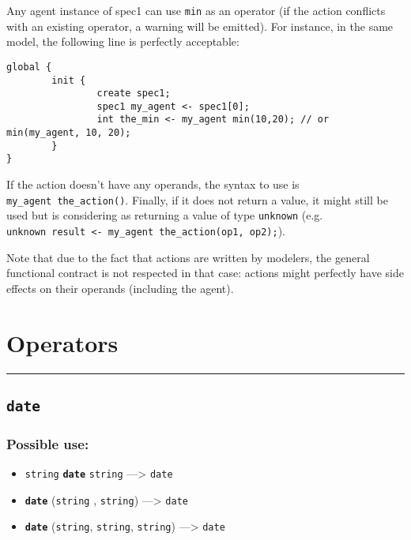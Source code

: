\documentclass[]{book}
\providecommand{\tightlist}{%
  \setlength{\itemsep}{0pt}\setlength{\parskip}{0pt}}
\theoremstyle{definition}
\theoremstyle{definition}
\theoremstyle{definition}
\theoremstyle{remark}
\begin{document}
Any agent instance of spec1 can use \texttt{min} as an operator (if the
action conflicts with an existing operator, a warning will be emitted).
For instance, in the same model, the following line is perfectly
acceptable:

\begin{verbatim}
global {
        init {
                create spec1;
                spec1 my_agent <- spec1[0];
                int the_min <- my_agent min(10,20); // or min(my_agent, 10, 20);
        }
}
\end{verbatim}

If the action doesn't have any operands, the syntax to use is
\texttt{my\_agent\ the\_action()}. Finally, if it does not return a
value, it might still be used but is considering as returning a value of
type \texttt{unknown} (e.g.
\texttt{unknown\ result\ \textless{}-\ my\_agent\ the\_action(op1,\ op2);}).

Note that due to the fact that actions are written by modelers, the
general functional contract is not respected in that case: actions might
perfectly have side effects on their operands (including the agent).

\section{Operators}\label{operators-2}

\begin{center}\rule{0.5\linewidth}{\linethickness}\end{center}

\subsection{\texorpdfstring{\texttt{date}}{date}}\label{date}

\subsubsection{Possible use:}\label{possible-use-124}

\begin{itemize}
\tightlist
\item
  \texttt{string} \textbf{\texttt{date}} \texttt{string}
  ---\textgreater{} \texttt{date}
\item
  \textbf{\texttt{date}} (\texttt{string} , \texttt{string})
  ---\textgreater{} \texttt{date}
\item
  \textbf{\texttt{date}} (\texttt{string}, \texttt{string},
  \texttt{string}) ---\textgreater{} \texttt{date}
\end{itemize}
\end{document}
